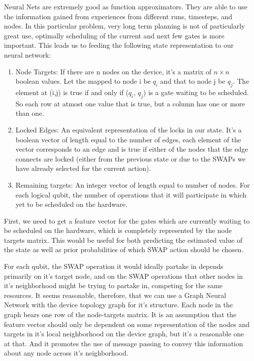 \documentclass[%
 reprint,
 amsmath,amssymb,
 aps,
]{revtex4-2}
\begin{document}
Neural Nets are extremely good as function approximators. They are able to use the information gained from experiences from different runs, timesteps, and nodes. In this particular problem, very long term planning is not of particularly great use, optimally scheduling of the current and next few gates is more important. This leads us to feeding the following state representation to our neural network:
\begin{enumerate}
    \item Node Targets: If there are n nodes on the device, it's a matrix of $n \times n$ boolean values. Let the mapped to node i be $q_i$ and that to node j be $q_j$. The element at (i,j) is true if and only if ($q_i$, $q_j$) is a gate waiting to be scheduled. So each row at atmost one value that is true, but a column has one or more than one.
    \item Locked Edges: An equivalent representation of the locks in our state. It's a boolean vector of length equal to the number of edges, each element of the vector corresponds to an edge and is true if either of the nodes that the edge connects are locked (either from the previous state or due to the SWAPs we have already selected for the current action).
    \item Remaining targets: An integer vector of length equal to number of nodes. For each logical qubit, the number of operations that it will participate in which yet to be scheduled on the hardware.
\end{enumerate}

First, we need to get a feature vector for the gates which are currently waiting to be scheduled on the hardware, which is completely represented by the node targets matrix. This would be useful for both predicting the estimated value of the state as well as prior probabilities of which SWAP action should be chosen.

For each qubit, the SWAP operation it would ideally partake in depends primarily on it's target node, and on the SWAP operations that other nodes in it's neighborhood might be trying to partake in, competing for the same resources. It seems reasonable, therefore, that we can use a Graph Neural Network with the device topology graph for it's structure. Each node in the graph bears one row of the node-targets matrix. It is an assumption that the feature vector should only be dependent on some representation of the nodes and targets in it's local neighborhood on the device graph, but it's a reasonable one at that. And it promotes the use of message passing to convey this information about any node across it's neighborhood.
\end{document}
